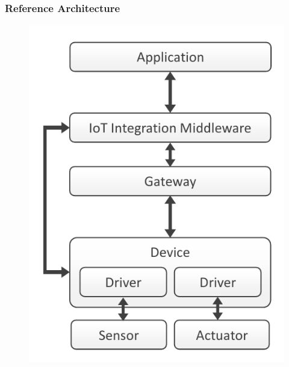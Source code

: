 \documentclass{../iot-lecture}
\begin{document}
\begin{frame}
  \frametitle{Reference Architecture}
  \begin{figure}
    \includegraphics[height=.8\textheight]{./img/iot-ref-arch.png}
  \end{figure}
\end{frame}
\end{document}
